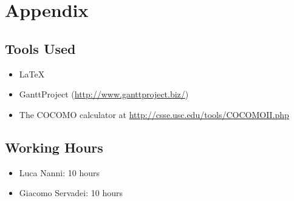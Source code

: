 \chapter{Appendix}

\section{Tools Used}
\begin{itemize}
	\item \LaTeX
	\item GanttProject (\url{http://www.ganttproject.biz/})
	\item The COCOMO calculator at \url{http://csse.usc.edu/tools/COCOMOII.php}
\end{itemize}

\section{Working Hours}
\begin{itemize}
	\item Luca Nanni: 10 hours
	\item Giacomo Servadei: 10 hours
\end{itemize}

